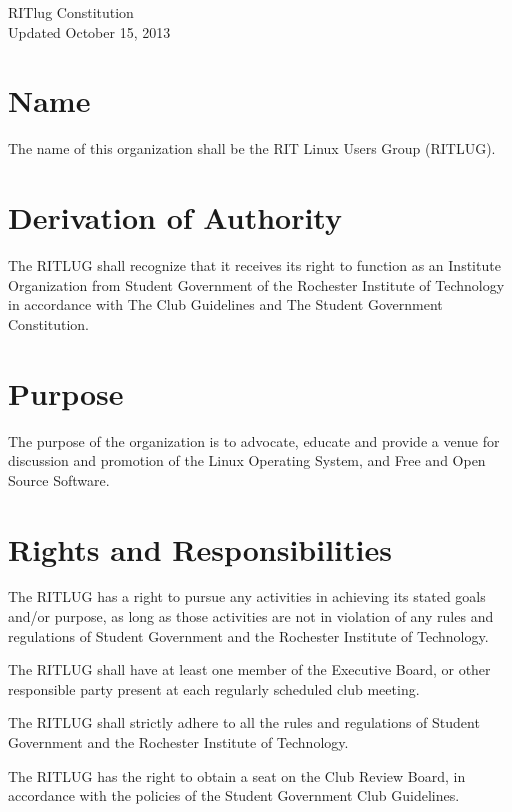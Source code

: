 


\begin{center}
\LARGE RITlug Constitution \\[0.0625in]
\large Updated October 15, 2013
\end{center}

\section{Name}
The name of this organization shall be the RIT Linux Users Group (RITLUG).

\section{Derivation of Authority}
The RITLUG shall recognize that it receives its right to function as an Institute Organization from Student Government of the Rochester Institute of Technology in accordance with The Club Guidelines and The Student Government Constitution.

\section{Purpose}
The purpose of the organization is to advocate, educate and provide a venue for discussion and promotion of the Linux Operating System, and Free and Open Source Software.

\section{Rights and Responsibilities}
\begin{subroutines}
\item The RITLUG has a right to pursue any activities in achieving its stated goals and/or purpose, as long as those activities are not in violation of any rules and regulations of Student Government and the Rochester Institute of Technology.
\item The RITLUG shall have at least one member of the Executive Board, or other responsible party present at each regularly scheduled club meeting.
\item The RITLUG shall strictly adhere to all the rules and regulations of Student Government and the Rochester Institute of Technology.
\item The RITLUG has the right to obtain a seat on the Club Review Board, in accordance with the policies of the Student Government Club Guidelines.
\end{subroutines}

